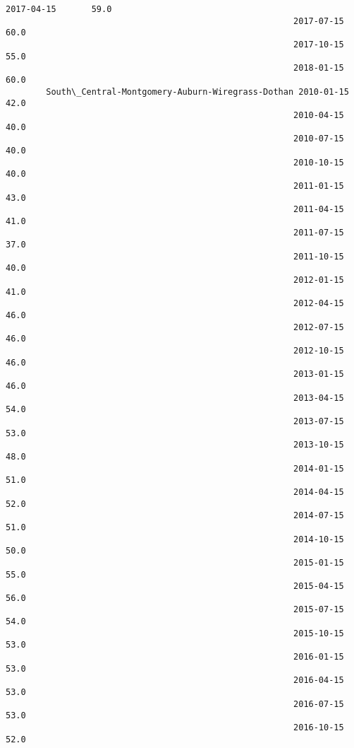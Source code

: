 \documentclass[11pt]{article}
\begin{document}
\begin{Verbatim}[commandchars=\\\{\}]
                                                         2017-04-15       59.0   
                                                         2017-07-15       60.0   
                                                         2017-10-15       55.0   
                                                         2018-01-15       60.0   
        South\_Central-Montgomery-Auburn-Wiregrass-Dothan 2010-01-15       42.0   
                                                         2010-04-15       40.0   
                                                         2010-07-15       40.0   
                                                         2010-10-15       40.0   
                                                         2011-01-15       43.0   
                                                         2011-04-15       41.0   
                                                         2011-07-15       37.0   
                                                         2011-10-15       40.0   
                                                         2012-01-15       41.0   
                                                         2012-04-15       46.0   
                                                         2012-07-15       46.0   
                                                         2012-10-15       46.0   
                                                         2013-01-15       46.0   
                                                         2013-04-15       54.0   
                                                         2013-07-15       53.0   
                                                         2013-10-15       48.0   
                                                         2014-01-15       51.0   
                                                         2014-04-15       52.0   
                                                         2014-07-15       51.0   
                                                         2014-10-15       50.0   
                                                         2015-01-15       55.0   
                                                         2015-04-15       56.0   
                                                         2015-07-15       54.0   
                                                         2015-10-15       53.0   
                                                         2016-01-15       53.0   
                                                         2016-04-15       53.0   
                                                         2016-07-15       53.0   
                                                         2016-10-15       52.0   

\end{Verbatim}
\end{document}
